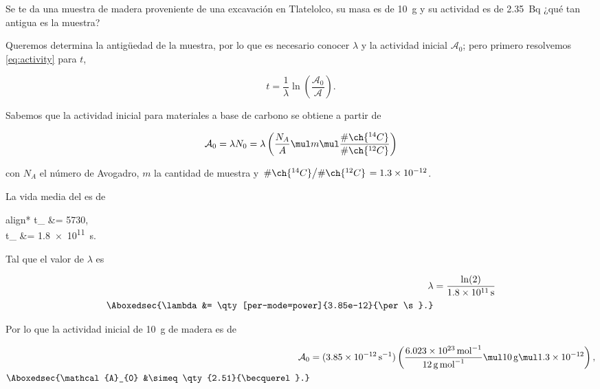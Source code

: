 \documentclass[./../main.tex]{subfiles}
\begin{document}
	\begin{exercise}
		Se te da una muestra de madera proveniente de una excavación en Tlatelolco, su masa es de \qty{10}{\g} y su actividad es de \qty{2.35}{\becquerel} ¿qué tan antigua es la muestra?

		\begin{solution}
			Queremos determina la antigüedad de la muestra, por lo que es necesario conocer \(\lambda\) y la actividad inicial \(\mathcal{A}_{0}\); pero primero resolvemos \cref{eq:activity} para \(t\),

			\begin{equation}
				t = \dfrac{1}{\lambda}\ln\left(\dfrac{\mathcal{A}_{0}}{\mathcal{A}}\right).
				\label{eq:time_for_activity}
			\end{equation}

			Sabemos que la actividad inicial para materiales a base de carbono se obtiene a partir de

			\begin{equation*}
				\mathcal{A}_{0} = \lambda N_{0} = \lambda\left(\dfrac{N_{A}}{A}\mul m \mul \dfrac{\#\ch{^{14}C}}{\#\ch{^{12}C}}\right)
			\end{equation*}

			con \(N_{A}\) el número de Avogadro, \(m\) la cantidad de muestra y \(\slashfrac{\#\ch{^{14}C}}{\#\ch{^{12}C}} = \num{1.3e-12}\).

			La vida media del  es de

			\begin{empheq}[box=\secbox]{align*}
				t_{} &= \qty{5730}{\years},\\
				t_{} &= \qty{1.8e11}{\s}.
			\end{empheq}

			Tal que el valor de \(\lambda\) es

			\begin{align}
				\lambda &= \dfrac{\ln(2)}{\qty{1.8e11}{\s}}\nonumber\\
				\Aboxedsec{\lambda &= \qty[per-mode=power]{3.85e-12}{\per\s}.}\label{eq:disintegration_constant}
			\end{align}

			Por lo que la actividad inicial de \qty{10}{\g} de madera es de

			\begin{align}
				\mathcal{A}_{0} &= (\qty[per-mode=power]{3.85e-12}{\per\s})\left(\dfrac{\qty[per-mode=power]{6.023e23}{\per\mol}}{\qty{12}{\g\per\mol}}\mul\qty{10}{\g}\mul\num{1.3e-12}\right),\nonumber\\
				\Aboxedsec{\mathcal{A}_{0} &\simeq \qty{2.51}{\becquerel}.}\label{eq:initial_activity}
			\end{align}


\end{solution}
\end{exercise}
\end{document}
